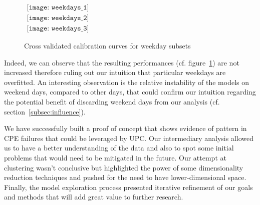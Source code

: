 \begin{figure}[h]
\begin{center}$
\begin{array}{c}
\texttt{[image: weekdays\_1]} \\
\texttt{[image: weekdays\_2]} \\
\texttt{[image: weekdays\_3]} 
\end{array}$
\end{center}
\caption{\label{weekdays} Cross validated calibration curves for weekday subsets}
\end{figure}

Indeed, we can observe that the resulting performances (cf. figure~\ref{weekdays}) are not increased therefore ruling out our intuition that particular weekdays are overfitted. An interesting observation is the relative instability of the models on weekend days, compared to other days, that could confirm our intuition regarding the potential benefit of discarding weekend days from our analysis (cf. section~\ref{subsec:influence}). 

\vspace{\baselineskip}
We have successfully built a proof of concept that shows evidence of pattern in CPE failures that could be leveraged by UPC. Our intermediary analysis allowed us to have a better understanding of the data and also to spot some initial problems that would need to be mitigated in the future. Our attempt at clustering wasn’t conclusive but highlighted the power of some dimensionality reduction techniques and pushed for the need to have lower-dimensional space. Finally, the model exploration process presented iterative refinement of our goals and methods that will add great value to further research. 